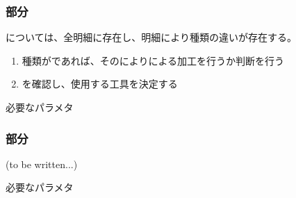 \clearpage
\subsubsection{\EndFaceChamferMilling 部分}
\EndFaceChamferMilling については、全明細に存在し、明細により種類の違いが存在する。
\begin{enumerate}[label=\sarrow]
\item 種類が\EndFaceCChamfer であれば、その\EndFaceCChamferLength により\MMC による加工を行うか判断を行う
\item \EndFaceCChamferAngle を確認し、使用する工具を決定する
\end{enumerate}
\begin{Parameter}{必要なパラメタ}
\PMChamferType%
\PMTopEndFaceOutCChamferLength
\PMTopEndFaceOutCChamferAngle%
\PMTopOutcutExists\\
\PMBottomEndFaceOutCChamferLength%
\PMBottomEndFaceOutCChamferAngle%
\PMBottomOutcutExists%
\end{Parameter}

\subsubsection{\EndFaceBoringMilling 部分\TBW}
(to be written...)
\begin{Parameter}{必要なパラメタ}
\PMEndFaceBoringExists%
\PMEndFaceBoringCornerR%
\end{Parameter}

